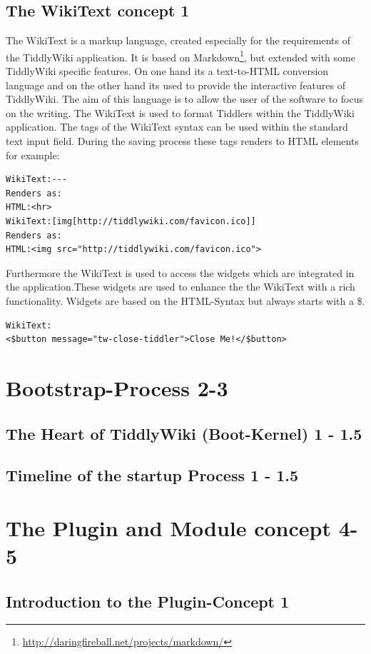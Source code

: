 \documentclass[12pt,a4paper]{article}
\begin{document}
\subsection{The WikiText concept 1}
The WikiText is a markup language, created especially for the requirements of the TiddlyWiki application. It is based on Markdown\footnote{\url{http://daringfireball.net/projects/markdown/}}, but extended with some TiddlyWiki specific features.  On one hand its a text-to-HTML conversion language and on the other hand its used to provide the interactive features of TiddlyWiki. The aim of this language is to allow the user of the software to focus on the writing.\cite{TIDD:WIKITEXT} The WikiText is used to format Tiddlers within the TiddlyWiki application. The tags of the WikiText syntax can be used within the standard text input field. 
During the saving process these tags renders to HTML elements for example:
\begin{lstlisting}[caption={Example use of WikiText},label=lst:data-div]
WikiText:--- 
Renders as:
HTML:<hr>
WikiText:[img[http://tiddlywiki.com/favicon.ico]]
Renders as: 
HTML:<img src="http://tiddlywiki.com/favicon.ico">
\end{lstlisting}
Furthermore the WikiText is used to access the widgets which are integrated in the application.These widgets are used to enhance the the WikiText with a rich functionality. Widgets are based on the HTML-Syntax but always starts with a \$.
\begin{lstlisting}[caption={Example use of widgets within WikiText},label=lst:data-div]
WikiText:
<$button message="tw-close-tiddler">Close Me!</$button> 
\end{lstlisting}
\section{Bootstrap-Process 2-3}
\subsection{The Heart of TiddlyWiki (Boot-Kernel) 1 - 1.5}
\subsection{Timeline of the startup Process 1 - 1.5}
\section{The Plugin and Module concept 4-5}
\subsection{Introduction to the Plugin-Concept 1}
\end{document}
